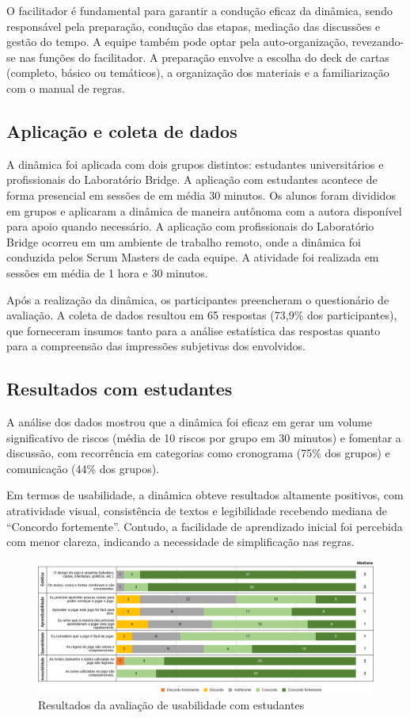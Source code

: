 \documentclass[12pt]{article}
\begin{document}
O facilitador é fundamental para garantir a condução eficaz da dinâmica, sendo responsável pela preparação, condução das etapas, mediação das discussões e gestão do tempo. A equipe também pode optar pela auto-organização, revezando-se nas funções do facilitador. A preparação envolve a escolha do deck de cartas (completo, básico ou temáticos), a organização dos materiais e a familiarização com o manual de regras.

\subsection{Aplicação e coleta de dados}
A dinâmica foi aplicada com dois grupos distintos: estudantes universitários e profissionais do Laboratório Bridge. A aplicação com estudantes acontece de forma presencial  em sessões de em média 30 minutos. Os alunos foram divididos em grupos e aplicaram a dinâmica de maneira autônoma com a autora disponível para apoio quando necessário. A aplicação com profissionais do Laboratório Bridge ocorreu em um ambiente de trabalho remoto, onde a dinâmica foi conduzida pelos Scrum Masters de cada equipe. A atividade foi realizada em sessões em média de 1 hora e 30 minutos.

Após a realização da dinâmica, os participantes preencheram o questionário de avaliação. A coleta de dados resultou em 65 respostas (73,9\% dos participantes), que forneceram insumos tanto para a análise estatística das respostas quanto para a compreensão das impressões subjetivas dos envolvidos.

\subsection{Resultados com estudantes}
A análise dos dados mostrou que a dinâmica foi eficaz em gerar um volume significativo de riscos (média de 10 riscos por grupo em 30 minutos) e fomentar a discussão, com recorrência em categorias como cronograma (75\% dos grupos) e comunicação (44\% dos grupos).

Em termos de usabilidade, a dinâmica obteve resultados altamente positivos, com atratividade visual, consistência de textos e legibilidade recebendo mediana de “Concordo fortemente”. Contudo, a facilidade de aprendizado inicial foi percebida com menor clareza, indicando a necessidade de simplificação nas regras.

\begin{figure}[H]
	\caption{\label{ufsc-usabilidade} Resultados da avaliação de usabilidade com estudantes}
  \includegraphics[width=\textwidth]{ufsc-usabilidade}
\end{figure}
\end{document}
